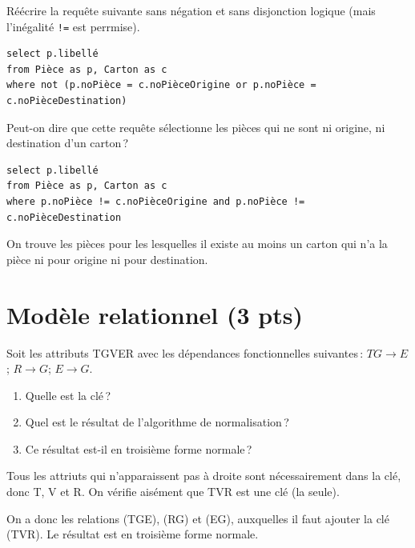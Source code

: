 Réécrire la requête suivante sans négation et sans disjonction logique
(mais l'inégalité \texttt{!=} est perrmise).


\begin{verbatim}
select p.libellé
from Pièce as p, Carton as c
where not (p.noPièce = c.noPièceOrigine or p.noPièce = c.noPièceDestination)
\end{verbatim}

Peut-on dire que cette requête sélectionne les pièces qui ne sont ni origine, ni destination
d'un carton\,?

\begin{solution}

\begin{verbatim}
select p.libellé
from Pièce as p, Carton as c
where p.noPièce != c.noPièceOrigine and p.noPièce != c.noPièceDestination
\end{verbatim}

On trouve les pièces pour les lesquelles il existe au moins un carton
qui n'a la pièce ni pour origine ni pour destination.
\end{solution}


\section{Modèle relationnel ({\bf 3 pts})}

Soit les attributs TGVER avec les dépendances fonctionnelles suivantes\,:
$TG \to E$; $R \to G$; $E \to G$.

\begin{enumerate}
  \item Quelle est la clé\,?
  \item Quel est le résultat de l'algorithme de normalisation\,?
  \item Ce résultat est-il en troisième forme normale\,?
\end{enumerate}


\begin{solution}
Tous les attriuts qui n'apparaissent pas à droite sont nécessairement
dans la clé, donc T, V  et R. On vérifie aisément que TVR est une clé
(la seule).

On a donc les relations (TGE), (RG) et (EG), auxquelles il faut ajouter la clé
(TVR). Le résultat est en troisième forme normale.

\end{solution}

